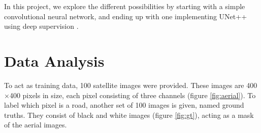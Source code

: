 \documentclass[10pt,conference,a4paper]{IEEEtran}
\begin{document}
In this project, we explore the different possibilities by starting with a simple convolutional neural network, and ending up with one implementing UNet++ using deep supervision \cite{unet++}.

\section{Data Analysis}
\label{data_analysis}

To act as training data, 100 satellite images were provided.
These images are 400$\times$400 pixels in size, each pixel consisting of three channels (figure \ref{fig:aerial}).
To label which pixel is a road, another set of 100 images is given, named ground truths.
They consist of black and white images (figure \ref{fig:gt}), acting as a mask of the aerial images.
\end{document}

